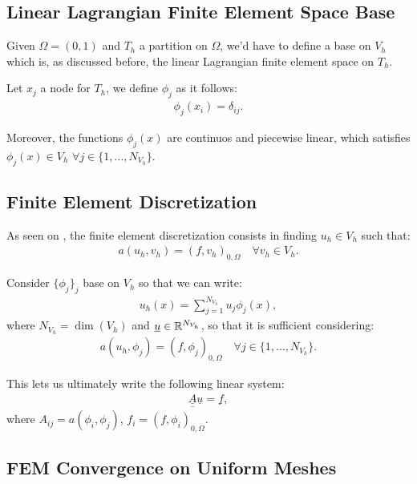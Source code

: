 \subsection{Linear Lagrangian Finite Element Space Base}

Given $\Omega = (0, 1)$ and $T_h$ a partition on $\Omega$, we'd have to define a base on $V_h$ which is, as discussed before, the linear Lagrangian finite element space on $T_h$.

Let $x_j$ a node for $T_h$, we define $\phi_j$ as it follows:
\begin{gather}
	\phi_j(x_i) = \delta_{ij}.
\end{gather}

Moreover, the functions $\phi_j(x)$ are continuos and piecewise linear, which satisfies $\phi_j(x) \in V_h$ $\forall j \in \{1, \dots, N_{V_h}\}$.

\subsection{Finite Element Discretization}

As seen on , the finite element discretization consists in finding $u_h \in V_h$ such that:
\begin{gather}
	a(u_h, v_h) = (f, v_h)_{0, \Omega} \quad \forall v_h \in V_h.
\end{gather}

Consider $\{\phi_j\}_j$ base on $V_h$ so that we can write:
\begin{gather}
	u_h(x) = \sum_{j = 1}^{N_{V_h}} u_j \phi_j(x),
\end{gather}
where $N_{V_h} = \dim(V_h)$ and $\underline{u} \in \mathbb{R}^{N_{V_h}}$, so that it is sufficient considering:
\begin{gather}
	a(u_h, \phi_j) = (f, \phi_j)_{0, \Omega} \quad \forall j \in \{1, \dots, N_{V_h}\}.
\end{gather}

This lets us ultimately write the following linear system:
\begin{gather}
	\underline{\underline{A}} \underline{u} = \underline{f},
\end{gather}
where $A_{ij} = a(\phi_i, \phi_j)$, $f_i = (f, \phi_i)_{0, \Omega}$.

\subsection{FEM Convergence on Uniform Meshes}

